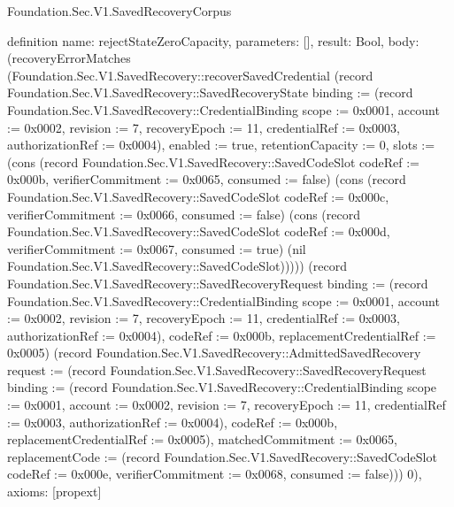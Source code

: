 \begin{lexlean}{Foundation.Sec.V1.SavedRecoveryCorpus}
\begin{semanticmodule}
definition{
  name: rejectStateZeroCapacity,
  parameters: [],
  result: Bool,
  body: (recoveryErrorMatches (Foundation.Sec.V1.SavedRecovery::recoverSavedCredential (record Foundation.Sec.V1.SavedRecovery::SavedRecoveryState {binding := (record Foundation.Sec.V1.SavedRecovery::CredentialBinding {scope := 0x0001, account := 0x0002, revision := 7, recoveryEpoch := 11, credentialRef := 0x0003, authorizationRef := 0x0004}), enabled := true, retentionCapacity := 0, slots := (cons (record Foundation.Sec.V1.SavedRecovery::SavedCodeSlot {codeRef := 0x000b, verifierCommitment := 0x0065, consumed := false}) (cons (record Foundation.Sec.V1.SavedRecovery::SavedCodeSlot {codeRef := 0x000c, verifierCommitment := 0x0066, consumed := false}) (cons (record Foundation.Sec.V1.SavedRecovery::SavedCodeSlot {codeRef := 0x000d, verifierCommitment := 0x0067, consumed := true}) (nil Foundation.Sec.V1.SavedRecovery::SavedCodeSlot))))}) (record Foundation.Sec.V1.SavedRecovery::SavedRecoveryRequest {binding := (record Foundation.Sec.V1.SavedRecovery::CredentialBinding {scope := 0x0001, account := 0x0002, revision := 7, recoveryEpoch := 11, credentialRef := 0x0003, authorizationRef := 0x0004}), codeRef := 0x000b, replacementCredentialRef := 0x0005}) (record Foundation.Sec.V1.SavedRecovery::AdmittedSavedRecovery {request := (record Foundation.Sec.V1.SavedRecovery::SavedRecoveryRequest {binding := (record Foundation.Sec.V1.SavedRecovery::CredentialBinding {scope := 0x0001, account := 0x0002, revision := 7, recoveryEpoch := 11, credentialRef := 0x0003, authorizationRef := 0x0004}), codeRef := 0x000b, replacementCredentialRef := 0x0005}), matchedCommitment := 0x0065, replacementCode := (record Foundation.Sec.V1.SavedRecovery::SavedCodeSlot {codeRef := 0x000e, verifierCommitment := 0x0068, consumed := false})})) 0),
  axioms: [propext]
}


\end{semanticmodule}
\end{lexlean}
